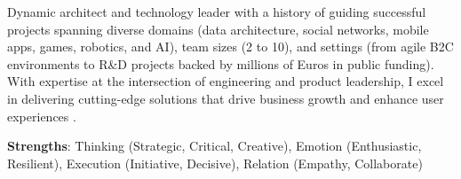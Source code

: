 


\begin{cvparagraph}


Dynamic architect and technology leader with a history of guiding successful projects spanning diverse domains (data architecture, social networks, mobile apps, games, robotics, and AI), team sizes (2 to 10), and settings (from agile B2C environments to R\&D projects backed by millions of Euros in public funding). With expertise at the intersection of engineering and product leadership, I excel in delivering cutting-edge solutions that drive business growth and enhance user experiences .

\textbf{Strengths}: Thinking (Strategic, Critical, Creative), Emotion (Enthusiastic, Resilient), Execution (Initiative, Decisive), Relation (Empathy, Collaborate)
\end{cvparagraph}

\vspace{-0.5ex}
